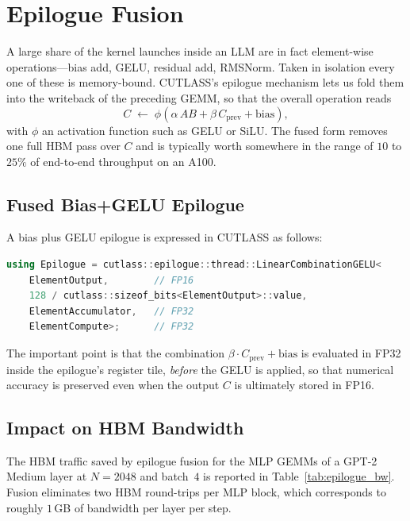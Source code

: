 \section{Epilogue Fusion}\label{sec:cutlass_epilogue}
A large share of the kernel launches inside an LLM are in fact
element-wise operations---bias add, GELU, residual add, RMSNorm.
Taken in isolation every one of these is memory-bound. CUTLASS's
epilogue mechanism lets us fold them into the writeback of the
preceding GEMM, so that the overall operation reads
\begin{equation}
    C \;\leftarrow\; \phi\!\left(\alpha\, A B +
                                 \beta\, C_{\text{prev}} +
                                 \text{bias}\right),
\end{equation}
with $\phi$ an activation function such as GELU or SiLU. The fused
form removes one full HBM pass over $C$ and is typically worth
somewhere in the range of $10$ to $25\%$ of end-to-end throughput
on an A100.

\subsection{Fused Bias+GELU
Epilogue}\label{sec:cutlass_bias_gelu}
A bias plus GELU epilogue is expressed in CUTLASS as follows:
\begin{lstlisting}[language=C++,basicstyle=\ttfamily\scriptsize]
using Epilogue = cutlass::epilogue::thread::LinearCombinationGELU<
    ElementOutput,        // FP16
    128 / cutlass::sizeof_bits<ElementOutput>::value,
    ElementAccumulator,   // FP32
    ElementCompute>;      // FP32
\end{lstlisting}
The important point is that the combination
$\beta \cdot C_{\text{prev}} + \text{bias}$ is evaluated in FP32
inside the epilogue's register tile, \emph{before} the GELU is
applied, so that numerical accuracy is preserved even when the
output $C$ is ultimately stored in FP16.

\subsection{Impact on HBM
Bandwidth}\label{sec:cutlass_hbm_impact}
The HBM traffic saved by epilogue fusion for the MLP GEMMs of a
GPT-2 Medium layer at $N = 2048$ and batch~$4$ is reported in
Table~\ref{tab:epilogue_bw}. Fusion eliminates two HBM
round-trips per MLP block, which corresponds to roughly $1$\,GB of
bandwidth per layer per step.

